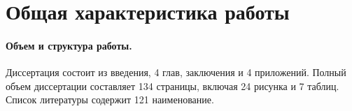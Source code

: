 
\section*{Общая характеристика работы}



\paragraph*{Объем и структура работы.}
Диссертация состоит из введения,
4 глав,
заключения и 4 приложений.
Полный объем диссертации составляет
134 страницы,
включая 24 рисунка и 7 таблиц.
Список литературы содержит 121 наименование.

